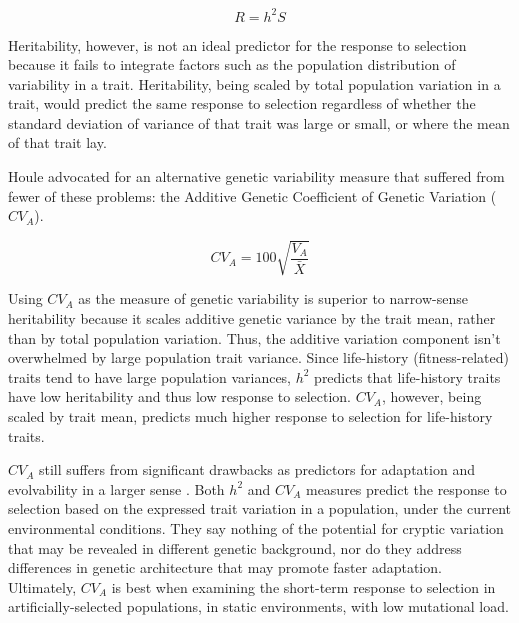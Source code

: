 \documentclass[PhD]{msu-thesis}
\begin{document}
\begin{equation}
R = {h^2}S
\end{equation}

Heritability, however, is not an ideal predictor for the response to selection because it fails to integrate factors such as the population distribution of variability in a trait\cite{houle_comparing_1992}. Heritability, being scaled by total population variation in a trait, would predict the same response to selection regardless of whether the standard deviation of variance of that trait was large or small, or where the mean of that trait lay.

Houle advocated for an alternative genetic variability measure that suffered from fewer of these problems: the Additive Genetic Coefficient of Genetic Variation ($CV_A$).

\begin{equation}
CV_A = 100\sqrt{\frac{V_A}{\bar X}}
\end{equation}

Using $CV_A$ as the measure of genetic variability is superior to narrow-sense heritability because it scales additive genetic variance by the trait mean, rather than by total population variation. Thus, the additive variation component isn’t overwhelmed by large population trait variance\cite{hansen_measuring_2008}. Since life-history (fitness-related) traits tend to have large population variances, $h^2$ predicts that life-history traits have low heritability and thus low response to selection\cite{price_low_1991}. $CV_A$, however, being scaled by trait mean, predicts much higher response to selection for life-history traits\cite{hansen_heritability_2011,houle_comparing_1992}.

$CV_A$ still suffers from significant drawbacks as predictors for adaptation and evolvability in a larger sense \cite{hansen_heritability_2011}. Both $h^2$ and $CV_A$ measures predict the response to selection based on the expressed trait variation in a population, under the current environmental conditions. They say nothing of the potential for cryptic variation that may be revealed in different genetic background, nor do they address differences in genetic architecture that may promote faster adaptation. Ultimately, $CV_A$ is best when examining the short-term response to selection in artificially-selected populations, in static environments, with low mutational load\cite{houle_comparing_1992}.
\end{document}
